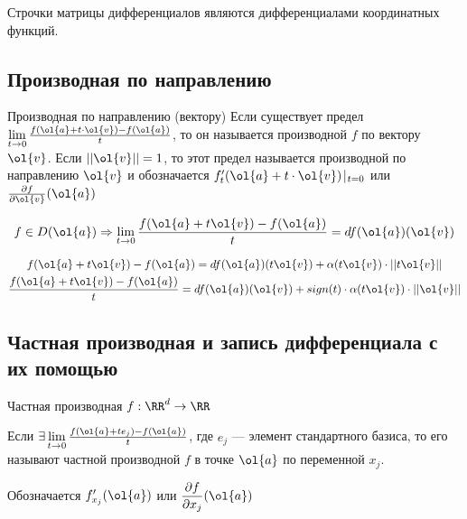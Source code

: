 \begin{remark}{}{}
    Строчки матрицы дифференциалов являются дифференциалами координатных функций.
\end{remark}

\newpage

\subsection{Производная по направлению}

\begin{defn}{Производная по направлению (вектору)}{}
    Если существует предел \( \lim\limits_{t \to 0} \frac{f(\ol{a} + t \cdot \ol{v}) - f(\ol{a})}{t} \),
    то он называется производной \( f \) по вектору \( \ol{v} \).
    Если \( ||\ol{v}|| = 1 \), то этот предел называется производной по направлению \( \ol{v} \)
    и обозначается \( f_t ' (\ol{a} + t \cdot \ol{v}) \: \vline_{\: t = 0} \)
    или \( \frac{\partial f}{\partial \ol{v}} (\ol{a}) \)
\end{defn}

\begin{thrm}{}{}
    \[
        f \in D(\ol{a}) \Rightarrow \lim\limits_{t \to 0} \frac{f(\ol{a} + t \ol{v}) - f(\ol{a})}{t} = df(\ol{a})(\ol{v})
    \]
\end{thrm}

\begin{gather*}
    f(\ol{a} + t \ol{v}) - f(\ol{a}) = df(\ol{a}) (t \ol{v}) + \alpha(t \ol{v}) \cdot || t \ol{v} ||
    \\
    \frac{f(\ol{a} + t \ol{v}) - f(\ol{a})}{t} = df(\ol{a}) (\ol{v}) + sign(t) \cdot \alpha(t \ol{v}) \cdot || \ol{v} ||
\end{gather*}

\subsection{Частная производная и запись дифференциала с их помощью}

\begin{defn}{Частная производная}{}
    \( f : \RR^d \to \RR \)

    Если \( \exists \lim\limits_{t \to 0} \frac{f(\ol{a} + t e_j)  - f(\ol{a})}{t} \),
    где \( e_j \) --- элемент стандартного базиса, то его называют частной производной \( f \) в точке \( \ol{a} \)
    по переменной \( x_j \).

    Обозначается \( f_{x_j}' (\ol{a}) \) или \( \displaystyle \frac{\partial f}{\partial x_j} (\ol{a}) \)
\end{defn}

